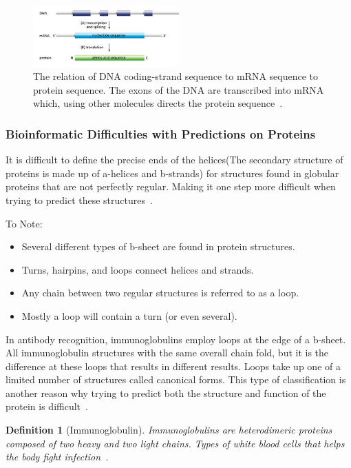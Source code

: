 \documentclass{report}
\newtheorem{definition}{Definition}[section]
\begin{document}
\begin{figure}[H]
    \centering
    \includegraphics[width=0.5\textwidth]{Transcription and translation.png}
    \caption{\label{fig:Transcription and translation}The relation of DNA coding-strand sequence to mRNA sequence to protein sequence. The exons of the DNA are transcribed into mRNA which, using other molecules directs the protein sequence~\cite{zvelebil_understanding_2008}.}
\end{figure}

\subsubsection{Bioinformatic Difficulties with Predictions on Proteins}

It is difficult to define the precise ends of the helices(The secondary structure of proteins is made up of a-helices and b-strands) for structures found in globular proteins that are not perfectly regular. Making it one step more difficult when trying to predict these structures~\cite{zvelebil_understanding_2008}.

To Note:
\begin{itemize}
    \item Several different types of b-sheet are found in protein structures.
    \item Turns, hairpins, and loops connect helices and strands. 
    \item Any chain between two regular structures is referred to as a loop.
    \item Mostly a loop will contain a turn (or even several).
\end{itemize} 

In antibody recognition, immunoglobulins employ loops at the edge of a b-sheet. All immunoglobulin structures with the same overall chain fold, but it is the difference at these loops that results in different results. Loops take up one of a limited number of structures called canonical forms. This type of classification is another reason why trying to predict both the structure and function of the protein is difficult~\cite{zvelebil_understanding_2008}.

\begin{definition}[Immunoglobulin]
    Immunoglobulins are heterodimeric proteins composed of two heavy and two light chains. Types of white blood cells that helps the body fight infection~\cite{schroeder_structure_2010}.
\end{definition}
\end{document}
